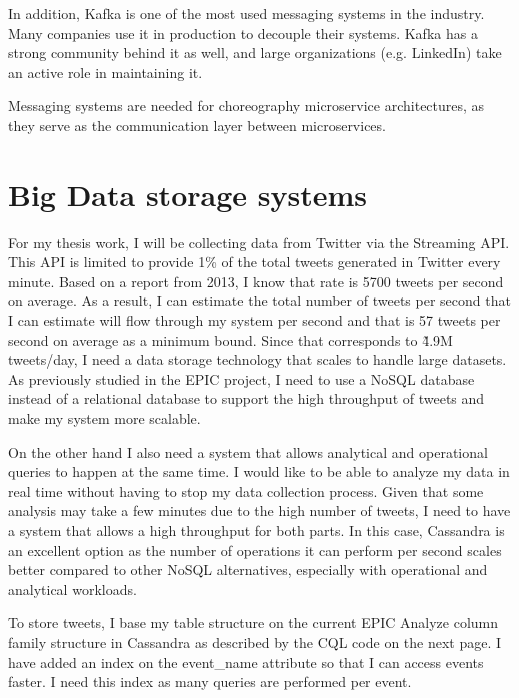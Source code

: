 In addition, Kafka is one of the most used messaging systems in the industry. Many companies use it in production to decouple their systems. Kafka has a strong community behind it as well, and large organizations (e.g. LinkedIn) take an active role in maintaining it. 

Messaging systems are needed for choreography microservice architectures, as they serve as the communication layer between microservices. 


\section{Big Data storage systems}

For my thesis work, I  will be collecting data from  Twitter via the Streaming API. This API is limited to provide 1\% of the total tweets generated in Twitter every minute. Based on a report from 2013, I know that rate is 5700 tweets\parencite{tweetsRecord} per second on average. As a result, I can estimate the total number of tweets per second that I can estimate will flow through my system per second and that is 57 tweets per second on average as a minimum bound. Since that corresponds to \~4.9M tweets/day, I need a data storage technology that scales to handle large datasets. As previously studied in the EPIC project\parencite{oopsla12}, I need to use a NoSQL database instead of a relational database to support the high throughput of tweets and make my system more scalable.

On the other hand I also need a system that allows analytical and operational queries to happen at the same time. I would like to be able to analyze my data in real time without having to stop my data collection process. Given that some analysis may take a few minutes due to the high number of tweets, I need to  have a system that allows a high throughput for both parts. In this case, Cassandra is an excellent option as the number of operations it can perform per second scales better compared to other NoSQL alternatives, especially with operational and analytical workloads.

To store tweets, I base my table structure on the current EPIC Analyze column family structure  in Cassandra as described by the CQL code on the next page. I have added an index on the event\_name attribute so that I can access events faster. I need this index as many queries are performed per event.


